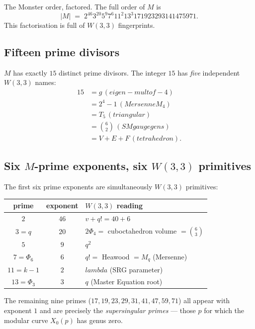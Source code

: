 \documentclass[11pt]{article}
\def\mathbb#1{#1}%
\def\mathbf#1{#1}%
\def\textbf#1{#1}%
\def\text#1{#1}%
\def\lambda{lambda}%
\def\Phi#1{Phi#1}%
\def\cdot{ }%
\begin{document}
\textbf{The Monster order, factored.} The full order of $\mathbb{M}$ is
\[
|\mathbb{M}| \;=\; 2^{46} \cdot 3^{20} \cdot 5^{9} \cdot 7^{6} \cdot 11^{2} \cdot 13^{3} \cdot 17 \cdot 19 \cdot 23 \cdot 29 \cdot 31 \cdot 41 \cdot 47 \cdot 59 \cdot 71.
\]
This factorisation is full of $W(3,3)$ fingerprints.

\subsection*{Fifteen prime divisors}

$\mathbb{M}$ has exactly $\mathbf{15}$ distinct prime divisors. The integer $15$ has \emph{five} independent $W(3,3)$ names:
\[
\begin{aligned}
15 &= g \, (\text{eigen-mult of } -4) \\
  &= 2^4 - 1 \, (\text{Mersenne } M_4) \\
  &= T_5 \, (\text{triangular}) \\
  &= \binom{6}{2} \, (\text{SM gauge gens}) \\
  &= V{+}E{+}F\,(\text{tetrahedron}).
\end{aligned}
\]

\subsection*{Six $\mathbb{M}$-prime exponents, six $W(3,3)$ primitives}

The first six prime exponents are simultaneously $W(3,3)$ primitives:

\begin{center}
\renewcommand{\arraystretch}{1.2}
\begin{tabular}{c c l}
\toprule
prime & exponent & $W(3,3)$ reading \\
\midrule
$2$ & $46$ & $v + q! = 40 + 6$ \\
$3 = q$ & $20$ & $2\Phi_4 = $ cuboctahedron volume $= \binom{6}{3}$ \\
$5$ & $9$ & $q^2$ \\
$7 = \Phi_6$ & $6$ & $q! = $ Heawood $= M_q$ (Mersenne) \\
$11 = k-1$ & $2$ & $\lambda$ (SRG parameter) \\
$13 = \Phi_3$ & $3$ & $q$ (Master Equation root) \\
\bottomrule
\end{tabular}
\end{center}

The remaining nine primes ($17, 19, 23, 29, 31, 41, 47, 59, 71$) all appear with exponent $1$ and are precisely the \emph{supersingular primes} --- those $p$ for which the modular curve $X_0(p)$ has genus zero.
\end{document}
